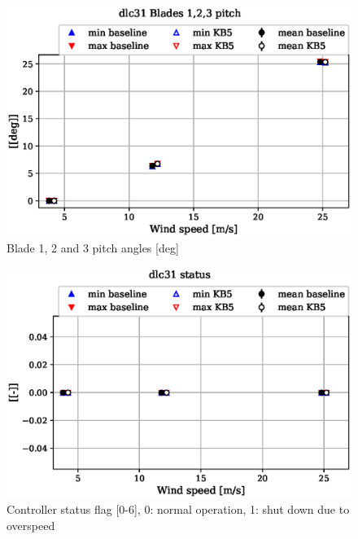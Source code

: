 \begin{figure}[!ht]
\begin{center}
	\includegraphics[width=.85\linewidth]{figures/baseline-vs-KB6/dlc31/bearing-pitch1-angle-deg_AA0007_AA0003.eps}
\end{center}
\caption{Blade 1, 2 and 3 pitch angles [deg]}
\label{fig:baseline-vs-KB6:dlc31:pitch}
\end{figure}

\begin{figure}[!ht]
\begin{center}
	\includegraphics[width=.85\linewidth]{figures/baseline-vs-KB6/dlc31/DLL-dtu_we_controller-inpvec-22_AA0007_AA0003.eps}
\end{center}
\caption{Controller status flag [0-6], 0: normal operation, 1: shut down due to overspeed}
\label{fig:baseline-vs-KB6:dlc31:status}
\end{figure}

